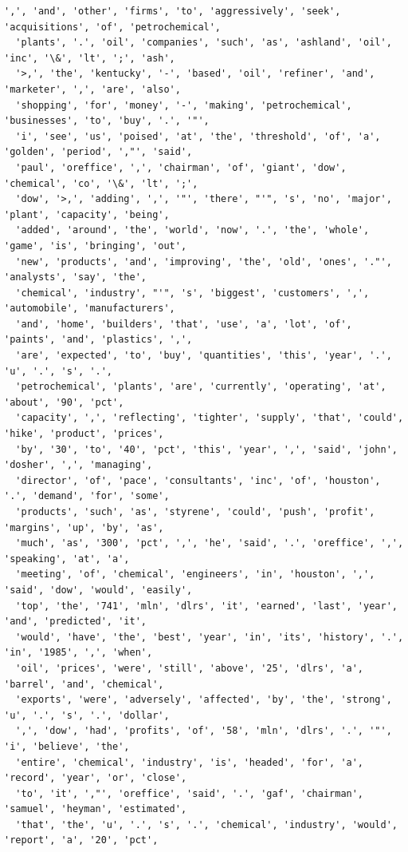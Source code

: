 \documentclass[18pt]{article}
\begin{document}
\begin{Verbatim}[commandchars=\\\{\}]
  ',', 'and', 'other', 'firms', 'to', 'aggressively', 'seek', 'acquisitions', 'of', 'petrochemical',
  'plants', '.', 'oil', 'companies', 'such', 'as', 'ashland', 'oil', 'inc', '\&', 'lt', ';', 'ash',
  '>,', 'the', 'kentucky', '-', 'based', 'oil', 'refiner', 'and', 'marketer', ',', 'are', 'also',
  'shopping', 'for', 'money', '-', 'making', 'petrochemical', 'businesses', 'to', 'buy', '.', '"',
  'i', 'see', 'us', 'poised', 'at', 'the', 'threshold', 'of', 'a', 'golden', 'period', ',"', 'said',
  'paul', 'oreffice', ',', 'chairman', 'of', 'giant', 'dow', 'chemical', 'co', '\&', 'lt', ';',
  'dow', '>,', 'adding', ',', '"', 'there', "'", 's', 'no', 'major', 'plant', 'capacity', 'being',
  'added', 'around', 'the', 'world', 'now', '.', 'the', 'whole', 'game', 'is', 'bringing', 'out',
  'new', 'products', 'and', 'improving', 'the', 'old', 'ones', '."', 'analysts', 'say', 'the',
  'chemical', 'industry', "'", 's', 'biggest', 'customers', ',', 'automobile', 'manufacturers',
  'and', 'home', 'builders', 'that', 'use', 'a', 'lot', 'of', 'paints', 'and', 'plastics', ',',
  'are', 'expected', 'to', 'buy', 'quantities', 'this', 'year', '.', 'u', '.', 's', '.',
  'petrochemical', 'plants', 'are', 'currently', 'operating', 'at', 'about', '90', 'pct',
  'capacity', ',', 'reflecting', 'tighter', 'supply', 'that', 'could', 'hike', 'product', 'prices',
  'by', '30', 'to', '40', 'pct', 'this', 'year', ',', 'said', 'john', 'dosher', ',', 'managing',
  'director', 'of', 'pace', 'consultants', 'inc', 'of', 'houston', '.', 'demand', 'for', 'some',
  'products', 'such', 'as', 'styrene', 'could', 'push', 'profit', 'margins', 'up', 'by', 'as',
  'much', 'as', '300', 'pct', ',', 'he', 'said', '.', 'oreffice', ',', 'speaking', 'at', 'a',
  'meeting', 'of', 'chemical', 'engineers', 'in', 'houston', ',', 'said', 'dow', 'would', 'easily',
  'top', 'the', '741', 'mln', 'dlrs', 'it', 'earned', 'last', 'year', 'and', 'predicted', 'it',
  'would', 'have', 'the', 'best', 'year', 'in', 'its', 'history', '.', 'in', '1985', ',', 'when',
  'oil', 'prices', 'were', 'still', 'above', '25', 'dlrs', 'a', 'barrel', 'and', 'chemical',
  'exports', 'were', 'adversely', 'affected', 'by', 'the', 'strong', 'u', '.', 's', '.', 'dollar',
  ',', 'dow', 'had', 'profits', 'of', '58', 'mln', 'dlrs', '.', '"', 'i', 'believe', 'the',
  'entire', 'chemical', 'industry', 'is', 'headed', 'for', 'a', 'record', 'year', 'or', 'close',
  'to', 'it', ',"', 'oreffice', 'said', '.', 'gaf', 'chairman', 'samuel', 'heyman', 'estimated',
  'that', 'the', 'u', '.', 's', '.', 'chemical', 'industry', 'would', 'report', 'a', '20', 'pct',

\end{Verbatim}
\end{document}
